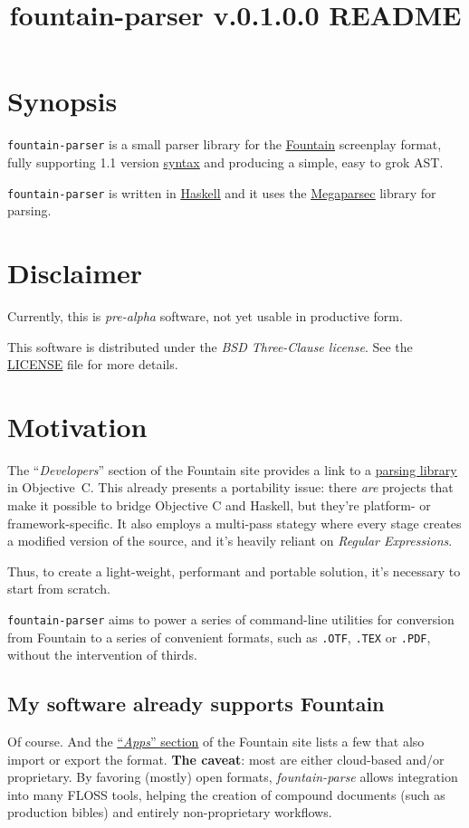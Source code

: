 \documentclass[11pt]{article}
\newcommand{\link}[2]{\underline{\color{darkblue}\href{#1}{#2}}}
\begin{document}
\title{\textbf{fountain-parser v.0.1.0.0 README}}
\author{}
\date{}
\maketitle

\section*{Synopsis}
\texttt{fountain-parser} is a small parser library for the
\link{https://fountain.io/}{\textrm{Fountain}} screenplay format,
fully supporting 1.1 version
\link{https://fountain.io/syntax/}{syntax} and
producing a simple, easy to grok \textrm{AST}.

\texttt{fountain-parser} is written in
\link{https://haskell.org}{\textrm{Haskell}} and it uses the
\link{https://hackage.haskell.org/package/megaparsec}{\textrm{Megaparsec}}
library for parsing.

\section*{Disclaimer}
Currently, this is \emph{pre-alpha} software, not yet usable in
productive form.

This software is distributed under the
\emph{\textrm{BSD Three-Clause license}}.
See the \link{run:./LICENSE}{LICENSE} file for more details.

\section*{Motivation}
The ``\emph{Developers}'' section of the Fountain site provides a
link to a
\link{https://github.com/nyousefi/Fountain}{parsing library}
in \textrm{Objective~C}. This already presents a portability
issue: there \emph{are} projects that make it possible to bridge
Objective C and Haskell, but they're platform- or
framework-specific.  It also employs a multi-pass stategy where
every stage creates a modified version of the source, and it's
heavily reliant on \emph{Regular Expressions}.

Thus, to create a light-weight, performant and portable
solution, it's necessary to start from scratch.

\texttt{fountain-parser} aims to power a series of command-line
utilities for conversion from Fountain to a series of convenient
formats, such as \texttt{.OTF}, \texttt{.TEX} or \texttt{.PDF},
without the intervention of thirds.

\subsection*{My software already supports Fountain}
Of course. And the
\link{https://fountain.io/apps/}{``\emph{Apps}''
section} of the Fountain site lists a few that also import or
export the format. \textbf{The caveat}: most are either
cloud-based and/or proprietary. By favoring (mostly) open formats,
\emph{fountain-parse} allows integration into many \textrm{FLOSS}
tools, helping the creation of compound documents (such as
production bibles) and entirely non-proprietary workflows.
\end{document}
